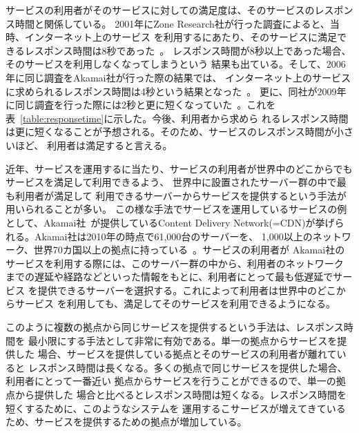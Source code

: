 サービスの利用者がそのサービスに対しての満足度は、そのサービスのレスポンス時間と関係している。
2001年にZone Research社が行った調査によると、当時、インターネット上のサービス
を利用するにあたり、そのサービスに満足できるレスポンス時間は8秒であった~\cite{zonaresearch}。
レスポンス時間が8秒以上であった場合、そのサービスを利用しなくなってしまうという
結果も出ている。そして、2006年に同じ調査をAkamai社が行った際の結果では、
インターネット上のサービスに求められるレスポンス時間は4秒という結果となった~\cite{akamai4sec}。
更に、同社が2009年に同じ調査を行った際には2秒と更に短くなっていた~\cite{acm:sigops}。これを
表~\ref{table:responsetime}に示した。今後、利用者から求めら
れるレスポンス時間は更に短くなることが予想される。そのため、サービスのレスポンス時間が小さいほど、
利用者は満足すると言える。

近年、サービスを運用するに当たり、サービスの利用者が世界中のどこからでもサービスを満足して利用できるよう、
世界中に設置されたサーバー群の中で最も利用者が満足して
利用できるサーバーからサービスを提供するという手法が用いられることが多い。
この様な手法でサービスを運用しているサービスの例として、Akamai社~\cite{akamai}が提供しているContent Delivery
Network(=CDN)が挙げられる。Akamai社は2010年の時点で61,000台のサーバーを、
1,000以上のネットワーク、世界70カ国以上の拠点に持っている~\cite{acm:sigops}。サービスの利用者が
Akamai社のサービスを利用する際には、このサーバー群の中から、利用者のネットワーク
までの遅延や経路などといった情報をもとに、利用者にとって最も低遅延でサービス
を提供できるサーバーを選択する。これによって利用者は世界中のどこからサービス
を利用しても、満足してそのサービスを利用できるようになる。

このように複数の拠点から同じサービスを提供するという手法は、レスポンス時間を
最小限にする手法として非常に有効である。単一の拠点からサービスを提供した
場合、サービスを提供している拠点とそのサービスの利用者が離れていると
レスポンス時間は長くなる。多くの拠点で同じサービスを提供した場合、利用者にとって一番近い
拠点からサービスを行うことができるので、単一の拠点から提供した
場合と比べるとレスポンス時間は短くなる。レスポンス時間を短くするために、このようなシステムを
運用するこサービスが増えてきているため、サービスを提供するための拠点が増加している。


